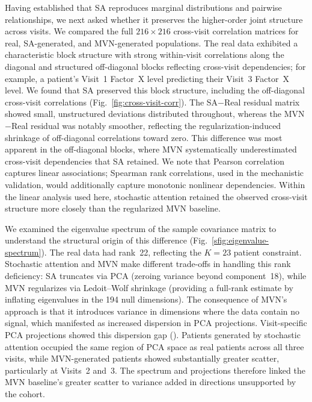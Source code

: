 Having established that SA reproduces marginal distributions and pairwise
relationships, we next asked whether it preserves the higher-order joint structure
across visits. We compared the full $216 \times 216$ cross-visit correlation matrices for real,
SA-generated, and MVN-generated populations. The real data exhibited a characteristic
block structure with strong within-visit correlations along the diagonal and
structured off-diagonal blocks reflecting cross-visit dependencies; for example,
a patient's Visit~1 Factor~X level predicting their Visit~3 Factor~X level. We found
that SA preserved this block structure, including the off-diagonal cross-visit
correlations (Fig.~\ref{fig:cross-visit-corr}). The SA$-$Real residual matrix showed
small, unstructured deviations distributed throughout, whereas the MVN$-$Real residual
was notably smoother, reflecting the regularization-induced shrinkage of off-diagonal
correlations toward zero. This difference was most apparent in the off-diagonal blocks,
where MVN systematically underestimated cross-visit dependencies that SA retained.
We note that Pearson correlation captures linear associations; Spearman rank
correlations, used in the mechanistic validation, would additionally capture
monotonic nonlinear dependencies. Within the linear analysis used here, stochastic attention
retained the observed cross-visit structure more closely than the regularized MVN baseline.

We examined the eigenvalue spectrum of the sample covariance matrix to understand the
structural origin of this difference (Fig.~\ref{sfig:eigenvalue-spectrum}). The real data had
rank~22, reflecting the $K{=}23$ patient constraint. Stochastic attention and MVN make different
trade-offs in handling this rank deficiency: SA truncates via PCA (zeroing variance
beyond component~18), while MVN regularizes via Ledoit--Wolf shrinkage (providing a
full-rank estimate by inflating eigenvalues in the 194 null dimensions). The
consequence of MVN's approach is that it introduces variance in dimensions where the
data contain no signal, which manifested as increased dispersion in PCA projections.
Visit-specific PCA projections showed this dispersion gap ().
Patients generated by stochastic attention occupied the same region of PCA space as real
patients across all three visits, while MVN-generated patients showed substantially greater scatter,
particularly at Visits~2 and~3. The spectrum and projections therefore linked the MVN
baseline's greater scatter to variance added in directions unsupported by the cohort.

